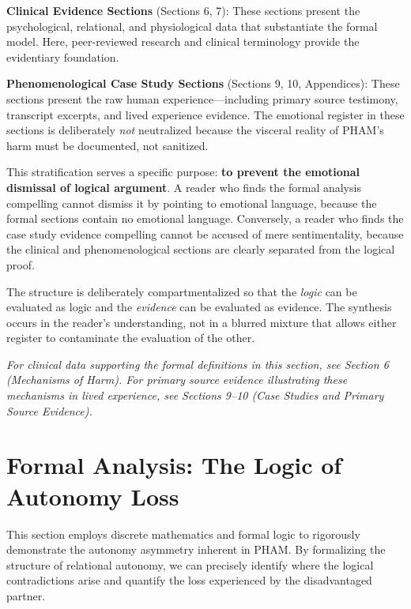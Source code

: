 \documentclass[12pt, letterpaper]{article}
\begin{document}
\textbf{Clinical Evidence Sections} (Sections 6, 7): These sections present the psychological, relational, and physiological data that substantiate the formal model. Here, peer-reviewed research and clinical terminology provide the evidentiary foundation.

\textbf{Phenomenological Case Study Sections} (Sections 9, 10, Appendices): These sections present the raw human experience---including primary source testimony, transcript excerpts, and lived experience evidence. The emotional register in these sections is deliberately \textit{not} neutralized because the visceral reality of PHAM's harm must be documented, not sanitized.

This stratification serves a specific purpose: \textbf{to prevent the emotional dismissal of logical argument}. A reader who finds the formal analysis compelling cannot dismiss it by pointing to emotional language, because the formal sections contain no emotional language. Conversely, a reader who finds the case study evidence compelling cannot be accused of mere sentimentality, because the clinical and phenomenological sections are clearly separated from the logical proof.

The structure is deliberately compartmentalized so that the \textit{logic} can be evaluated as logic and the \textit{evidence} can be evaluated as evidence. The synthesis occurs in the reader's understanding, not in a blurred mixture that allows either register to contaminate the evaluation of the other.

\textit{For clinical data supporting the formal definitions in this section, see Section 6 (Mechanisms of Harm). For primary source evidence illustrating these mechanisms in lived experience, see Sections 9--10 (Case Studies and Primary Source Evidence).}

\section{Formal Analysis: The Logic of Autonomy Loss}

This section employs discrete mathematics and formal logic to rigorously demonstrate the autonomy asymmetry inherent in PHAM. By formalizing the structure of relational autonomy, we can precisely identify where the logical contradictions arise and quantify the loss experienced by the disadvantaged partner.
\end{document}
